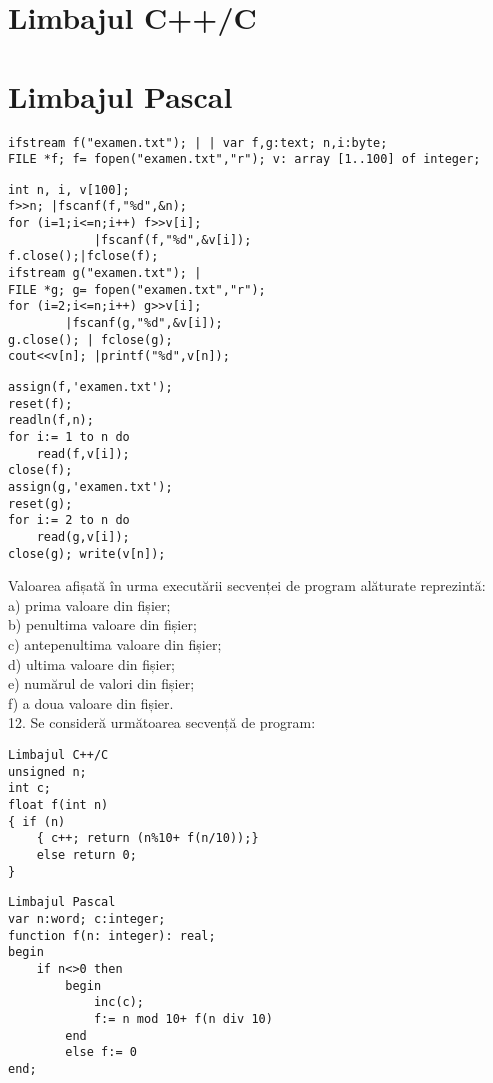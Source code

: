 \section*{Limbajul C++/C}
\section*{Limbajul Pascal}
\begin{verbatim}
ifstream f("examen.txt"); | | var f,g:text; n,i:byte;
FILE *f; f= fopen("examen.txt","r"); v: array [1..100] of integer;
\end{verbatim}

\begin{verbatim}
int n, i, v[100];
f>>n; |fscanf(f,"%d",&n);
for (i=1;i<=n;i++) f>>v[i];
            |fscanf(f,"%d",&v[i]);
f.close();|fclose(f);
ifstream g("examen.txt"); |
FILE *g; g= fopen("examen.txt","r");
for (i=2;i<=n;i++) g>>v[i];
        |fscanf(g,"%d",&v[i]);
g.close(); | fclose(g);
cout<<v[n]; |printf("%d",v[n]);
\end{verbatim}

\begin{verbatim}
assign(f,'examen.txt');
reset(f);
readln(f,n);
for i:= 1 to n do
    read(f,v[i]);
close(f);
assign(g,'examen.txt');
reset(g);
for i:= 2 to n do
    read(g,v[i]);
close(g); write(v[n]);
\end{verbatim}

Valoarea afișată în urma executării secvenței de program alăturate reprezintă:\\
a) prima valoare din fișier;\\
b) penultima valoare din fișier;\\
c) antepenultima valoare din fișier;\\
d) ultima valoare din fișier;\\
e) numărul de valori din fișier;\\
f) a doua valoare din fișier.\\
12. Se consideră următoarea secvență de program:

\begin{verbatim}
Limbajul C++/C
unsigned n;
int c;
float f(int n)
{ if (n)
    { c++; return (n%10+ f(n/10));}
    else return 0;
}
\end{verbatim}

\begin{verbatim}
Limbajul Pascal
var n:word; c:integer;
function f(n: integer): real;
begin
    if n<>0 then
        begin
            inc(c);
            f:= n mod 10+ f(n div 10)
        end
        else f:= 0
end;
\end{verbatim}

